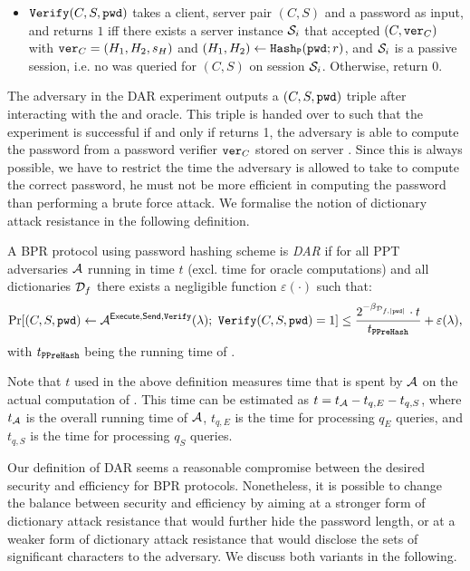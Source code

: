 \begin{itemize}
  \item $\mathtt{Verify}(C,S,\mathtt{pwd})$ takes a client, server pair $(C,S)$ and a password \pwd as input, and returns $1$ iff there exists a server instance $\mathcal{S}_i$ that accepted $(C,\mathtt{ver}_C)$ with $\mathtt{ver}_C=(H_1,H_2,s_H)$ and $(H_1,H_2)\gets\mathtt{Hash_P}(\mathtt{pwd};r)$, and $\mathcal{S}_i$ is a passive session, i.e. no \Send was queried for $(C,S)$ on session $\mathcal{S}_i$.
        Otherwise, return $0$.
\end{itemize}

\noindent
The adversary in the \ac{DAR} experiment outputs a $(C,S,\mathtt{pwd})$ triple after interacting with the \Execute and \Send oracle.
This triple is handed over to \Verify such that the experiment is successful if and only if \Verify returns 1, \ie the adversary is able to compute the password \pwd from a password verifier $\mathtt{ver}_C$ stored on server \Server.
Since this is always possible, we have to restrict the time the adversary is allowed to take to compute the correct password, \ie he must not be more efficient in computing the password than performing a brute force attack.
We formalise the notion of dictionary attack resistance in the following definition.

\begin{definition}\label{def:dar}
A \ac{BPR} protocol using password hashing scheme \Hash is \emph{\acl{DAR}} if for all \ac{PPT} adversaries $\mathcal{A}$ running in time $t$ (excl. time for oracle computations) and all dictionaries $\mathcal{D}_f$ there exists a negligible function $\varepsilon(\cdot)$ such that:
\[\Pr[(C,S,\mathtt{pwd})\gets\mathcal{A}^{\mathsf{Execute}, \mathsf{Send}, \mathtt{Verify}}(\lambda);~ \mathtt{Verify}(C,S,\mathtt{pwd})=1] \leq \frac{2^{-\beta_{\mathcal{D}_{f,|\mathtt{pwd}|}}}\cdot t}{t_{\mathtt{PPreHash}}} + \varepsilon(\lambda),\]
with $t_\mathtt{PPreHash}$ being the running time of \PPreHash.
\eod
\end{definition}

\noindent
Note that $t$ used in the above definition measures time that is spent by $\mathcal{A}$ on the actual computation of \pwd. 
This time can be estimated as $t=t_\mathcal{A}-t_{q,E}-t_{q,S}$, where  $t_\mathcal{A}$ is the overall running time of $\mathcal{A}$, $t_{q,E}$ is the time for processing $q_E$ \Execute queries, and $t_{q,S}$ is the time for processing $q_S$ \Send queries. 


Our definition of \ac{DAR} seems a reasonable compromise between the desired security and efficiency for \ac{BPR} protocols.
Nonetheless, it is possible to change the balance between security and efficiency by aiming at a stronger form of dictionary attack resistance that would further hide the password length, or at a weaker form of dictionary attack resistance that would disclose the sets of significant characters to the adversary. We discuss both variants in the following.

